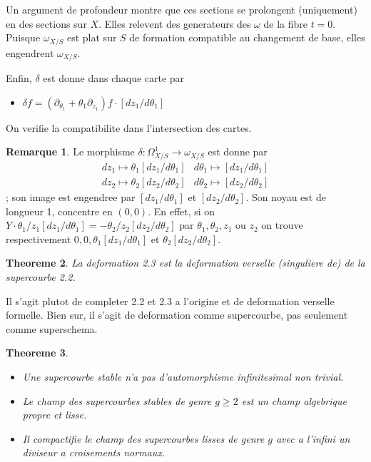 \documentclass[11pt,a4paper]{article}
\theoremstyle{plain}
\newtheorem{theorem}{Theoreme}
\theoremstyle{definition}
\newtheorem{remark}[theorem]{Remarque}
\begin{document}
Un argument de profondeur montre que ces sections se prolongent (uniquement) en des sections sur $X$. Elles relevent des generateurs des $\omega$ de la fibre $t=0$. Puisque $\omega_{X/S}$ est plat sur $S$ de formation compatible au changement de base, elles engendrent $\omega_{X/S}$.

Enfin, $\delta$ est donne dans chaque carte par
\begin{itemize}
\item[(1)] $\delta f = (\partial_{\theta_1} + \theta_1\partial_{z_1})f \cdot [dz_1/d\theta_1]$
\end{itemize}
On verifie la compatibilite dans l'intersection des cartes.

\newpage

\begin{remark}\label{rem2.4}
Le morphisme $\delta : \Omega^1_{X/S} \to \omega_{X/S}$ est donne par
\[
\begin{array}{ll}
dz_1 \longmapsto \theta_1[dz_1/d\theta_1] & d\theta_1 \longmapsto [dz_1/d\theta_1] \\
dz_2 \longmapsto \theta_2[dz_2/d\theta_2] & d\theta_2 \longmapsto [dz_2/d\theta_2]
\end{array}
\]
; son image est engendree par $[dz_1/d\theta_1]$ et $[dz_2/d\theta_2]$. Son noyau est de longueur 1, concentre en $(0,0)$. En effet, si on $Y \cdot \theta_1/z_1 [dz_1/d\theta_1] = -\theta_2/z_2 [dz_2/d\theta_2]$ par $\theta_1, \theta_2, z_1$ ou $z_2$ on trouve respectivement $0, 0, \theta_1[dz_1/d\theta_1]$ et $\theta_2[dz_2/d\theta_2]$.
\end{remark}

\begin{theorem}\label{thm2.5}
La deformation 2.3 est la deformation verselle (singuliere de) de la supercourbe 2.2.
\end{theorem}

Il s'agit plutot de completer 2.2 et 2.3 a l'origine et de deformation verselle formelle. Bien sur, il s'agit de deformation comme supercourbe, pas seulement comme superschema.

\begin{theorem}\label{thm2.6}
\begin{itemize}
\item[(i)] Une supercourbe stable n'a pas d'automorphisme infinitesimal non trivial.
\item[(ii)] Le champ des supercourbes stables de genre $g \geq 2$ est un champ algebrique propre et lisse.
\item[(iii)] Il compactifie le champ des supercourbes lisses de genre $g$ avec a l'infini un diviseur a croisements normaux.
\end{itemize}
\end{theorem}
\end{document}
